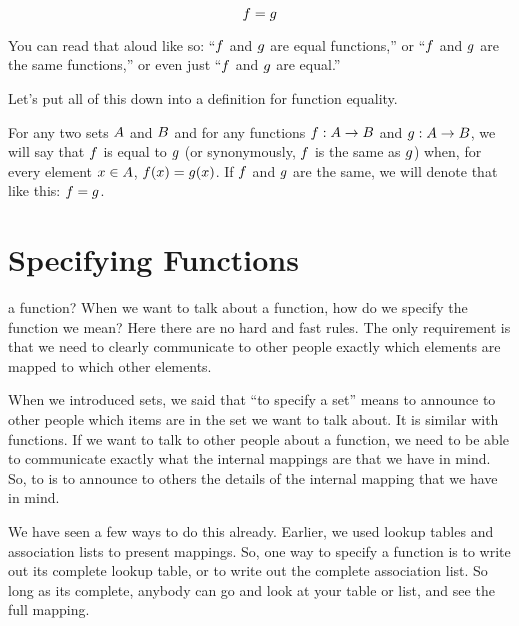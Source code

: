 \documentclass[../../../main.tex]{subfiles}
\begin{document}
\begin{equation*}
  f = g
\end{equation*}

You can read that aloud like so: ``$f$ and $g$ are equal functions,'' or ``$f$ and $g$ are the same functions,'' or even just ``$f$ and $g$ are equal.'' 

Let's put all of this down into a definition for function equality.

\begin{fdefinition}
  \label{def:function-equality}
  For any two sets $A$ and $B$ and for any functions $f: A \rightarrow B$ and $g: A \rightarrow B$, we will say that $f$ is equal to $g$ (or synonymously, $f$ is the same as $g$) when, for every element $x \in A$, $f(x) = g(x)$. If $f$ and $g$ are the same, we will denote that like this: $f = g$.
\end{fdefinition}


\section{Specifying Functions}

 a function? When we want to talk about a function, how do we specify the function we mean? Here there are no hard and fast rules. The only requirement is that we need to clearly communicate to other people exactly which elements are mapped to which other elements.

\begin{terminology}
  When we introduced sets, we said that ``to specify a set'' means to announce to other people which items are in the set we want to talk about. It is similar with functions. If we want to talk to other people about a function, we need to be able to communicate exactly what the internal mappings are that we have in mind. So, to  is to announce to others the details of the internal mapping that we have in mind.
\end{terminology}

We have seen a few ways to do this already. Earlier, we used lookup tables and association lists to present mappings. So, one way to specify a function is to write out its complete lookup table, or to write out the complete association list. So long as its complete, anybody can go and look at your table or list, and see the full mapping.
\end{document}
